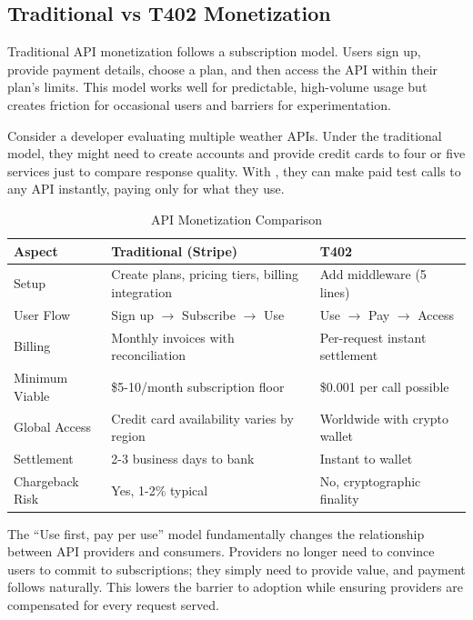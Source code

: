\subsection{Traditional vs T402 Monetization}

Traditional API monetization follows a subscription model. Users sign up, provide payment details, choose a plan, and then access the API within their plan's limits. This model works well for predictable, high-volume usage but creates friction for occasional users and barriers for experimentation.

Consider a developer evaluating multiple weather APIs. Under the traditional model, they might need to create accounts and provide credit cards to four or five services just to compare response quality. With \tprotocol{}, they can make paid test calls to any API instantly, paying only for what they use.

\begin{table}[htbp]
\centering
\caption{API Monetization Comparison}
\label{tab:monetization-comparison}
\footnotesize
\begin{tabular}{l p{4cm} p{4cm}}
\toprule
\textbf{Aspect} & \textbf{Traditional (Stripe)} & \textbf{T402} \\
\midrule
Setup & Create plans, pricing tiers, billing integration & Add middleware (5 lines) \\
User Flow & Sign up $\to$ Subscribe $\to$ Use & Use $\to$ Pay $\to$ Access \\
Billing & Monthly invoices with reconciliation & Per-request instant settlement \\
Minimum Viable & \$5-10/month subscription floor & \$0.001 per call possible \\
Global Access & Credit card availability varies by region & Worldwide with crypto wallet \\
Settlement & 2-3 business days to bank & Instant to wallet \\
Chargeback Risk & Yes, 1-2\% typical & No, cryptographic finality \\
\bottomrule
\end{tabular}
\end{table}

The ``Use first, pay per use'' model fundamentally changes the relationship between API providers and consumers. Providers no longer need to convince users to commit to subscriptions; they simply need to provide value, and payment follows naturally. This lowers the barrier to adoption while ensuring providers are compensated for every request served.

